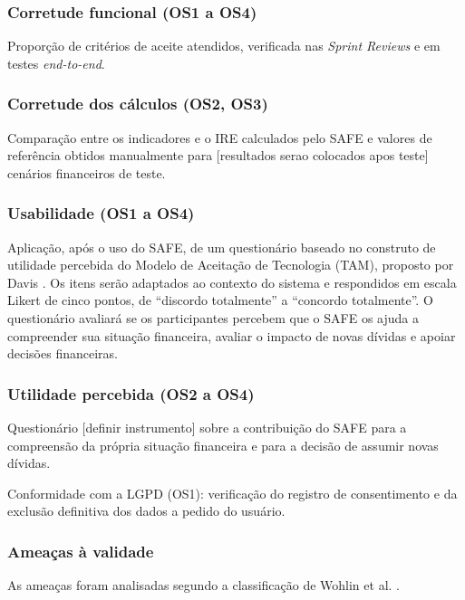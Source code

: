 \documentclass[portuguese]{sbc2025}%
\begin{document}
\subsubsection{Corretude funcional (OS1 a OS4)}

Proporção de critérios de aceite atendidos, verificada nas \textit{Sprint Reviews} e em testes \textit{end-to-end}.

\subsubsection{Corretude dos cálculos (OS2, OS3)}

Comparação entre os indicadores e o IRE calculados pelo SAFE e valores de referência obtidos manualmente para [resultados serao colocados apos teste] cenários financeiros de teste.

\subsubsection{Usabilidade (OS1 a OS4)}

Aplicação, após o uso do SAFE, de um questionário baseado no construto de utilidade percebida do Modelo de Aceitação de Tecnologia (TAM), proposto por Davis \citeyearpar{davis1989}. Os itens serão adaptados ao contexto do sistema e respondidos em escala Likert de cinco pontos, de “discordo totalmente” a “concordo totalmente”. O questionário avaliará se os participantes percebem que o SAFE os ajuda a compreender sua situação financeira, avaliar o impacto de novas dívidas e apoiar decisões financeiras.

\subsubsection{Utilidade percebida (OS2 a OS4)}

Questionário [definir instrumento] sobre a contribuição do SAFE para a compreensão da própria situação financeira e para a decisão de assumir novas dívidas.

Conformidade com a LGPD (OS1): verificação do registro de consentimento e da exclusão definitiva dos dados a pedido do usuário.

\subsubsection{Ameaças à validade}

As ameaças foram analisadas segundo a classificação de Wohlin et al. \citeyearpar{wohlin2012}.
\end{document}
